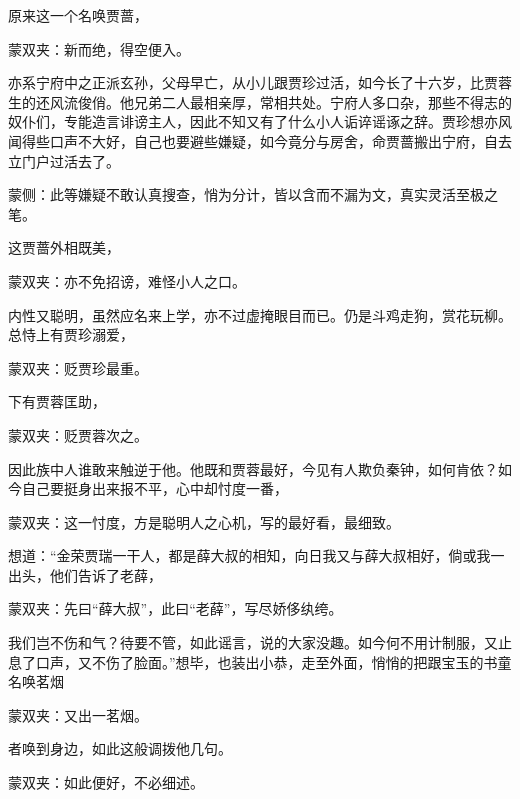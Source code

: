 \begin{parag}
    原来这一个名唤贾蔷，\begin{note}蒙双夹：新而绝，得空便入。\end{note}亦系宁府中之正派玄孙，父母早亡，从小儿跟贾珍过活，如今长了十六岁，比贾蓉生的还风流俊俏。他兄弟二人最相亲厚，常相共处。宁府人多口杂，那些不得志的奴仆们，专能造言诽谤主人，因此不知又有了什么小人诟谇谣诼之辞。贾珍想亦风闻得些口声不大好，自己也要避些嫌疑，如今竟分与房舍，命贾蔷搬出宁府，自去立门户过活去了。\begin{note}蒙侧：此等嫌疑不敢认真搜查，悄为分计，皆以含而不漏为文，真实灵活至极之笔。\end{note}这贾蔷外相既美，\begin{note}蒙双夹：亦不免招谤，难怪小人之口。\end{note}内性又聪明，虽然应名来上学，亦不过虚掩眼目而已。仍是斗鸡走狗，赏花玩柳。总恃上有贾珍溺爱，\begin{note}蒙双夹：贬贾珍最重。\end{note}下有贾蓉匡助，\begin{note}蒙双夹：贬贾蓉次之。\end{note}因此族中人谁敢来触逆于他。他既和贾蓉最好，今见有人欺负秦钟，如何肯依？如今自己要挺身出来报不平，心中却忖度一番，\begin{note}蒙双夹：这一忖度，方是聪明人之心机，写的最好看，最细致。\end{note}想道：“金荣贾瑞一干人，都是薛大叔的相知，向日我又与薛大叔相好，倘或我一出头，他们告诉了老薛，\begin{note}蒙双夹：先曰“薛大叔”，此曰“老薛”，写尽娇侈纨绔。\end{note}我们岂不伤和气？待要不管，如此谣言，说的大家没趣。如今何不用计制服，又止息了口声，又不伤了脸面。”想毕，也装出小恭，走至外面，悄悄的把跟宝玉的书童名唤茗烟\begin{note}蒙双夹：又出一茗烟。\end{note}者唤到身边，如此这般调拨他几句。\begin{note}蒙双夹：如此便好，不必细述。\end{note}
\end{parag}


